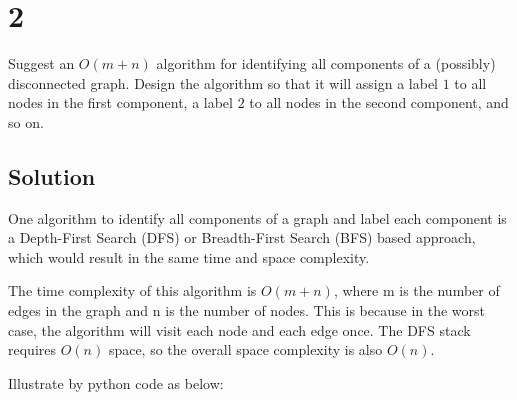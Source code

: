 \documentclass[11pt]{article}
\begin{document}
    \hypertarget{section}{%
\section{2}\label{section}}

Suggest an \(O(m+n)\) algorithm for identifying all components of a
(possibly) disconnected graph. Design the algorithm so that it will
assign a label \(1\) to all nodes in the first component, a label \(2\)
to all nodes in the second component, and so on.

\hypertarget{solution}{%
\subsection{Solution}\label{solution}}

One algorithm to identify all components of a graph and label each
component is a Depth-First Search (DFS) or Breadth-First Search (BFS)
based approach, which would result in the same time and space
complexity.

The time complexity of this algorithm is \(O(m + n)\), where m is the
number of edges in the graph and n is the number of nodes. This is
because in the worst case, the algorithm will visit each node and each
edge once. The DFS stack requires \(O(n)\) space, so the overall space
complexity is also \(O(n)\).

Illustrate by python code as below:
\end{document}
